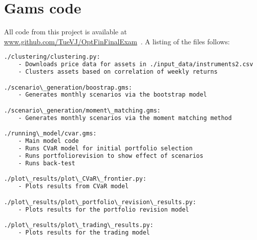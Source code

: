 \section{Gams code\label{sec:appendixcode}}

All code from this project is available at \url{www.github.com/TueVJ/OptFinFinalExam}~. A listing of the files follows:

\begin{lstlisting}[language=sh]
./clustering/clustering.py:
	- Downloads price data for assets in ./input_data/instruments2.csv over the relevant period.
	- Clusters assets based on correlation of weekly returns

./scenario\_generation/boostrap.gms:
	- Generates monthly scenarios via the bootstrap model

./scenario\_generation/moment\_matching.gms:
	- Generates monthly scenarios via the moment matching method

./running\_model/cvar.gms:
	- Main model code
	- Runs CVaR model for initial portfolio selection
	- Runs portfoliorevision to show effect of scenarios
	- Runs back-test

./plot\_results/plot\_CVaR\_frontier.py:
	- Plots results from CVaR model

./plot\_results/plot\_portfolio\_revision\_results.py:
	- Plots results for the portfolio revision model

./plot\_results/plot\_trading\_results.py:
	- Plots results for the trading model
\end{lstlisting}